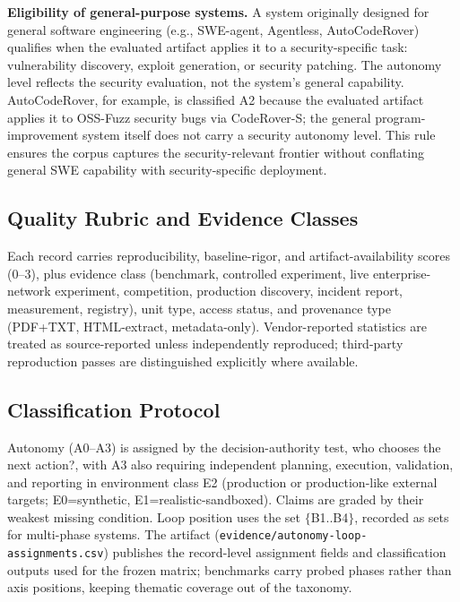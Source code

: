 \documentclass[conference,compsoc]{IEEEtran}
\begin{document}
\textbf{Eligibility of general-purpose systems.} A system originally designed for general
software engineering (e.g., SWE-agent, Agentless, AutoCodeRover) qualifies when the
evaluated artifact applies it to a security-specific task: vulnerability discovery, exploit
generation, or security patching. The autonomy level reflects the security evaluation, not
the system's general capability. AutoCodeRover, for example, is classified A2 because the
evaluated artifact applies it to OSS-Fuzz security bugs via CodeRover-S; the general
program-improvement system itself does not carry a security autonomy level. This rule ensures
the corpus captures the security-relevant frontier without conflating general SWE
capability with security-specific deployment.

\subsection{Quality Rubric and Evidence Classes}
Each record carries reproducibility, baseline-rigor, and artifact-availability scores (0--3),
plus evidence class (benchmark, controlled experiment, live enterprise-network experiment,
competition, production discovery, incident report, measurement, registry), unit type, access
status, and provenance type (PDF+TXT, HTML-extract, metadata-only). Vendor-reported statistics
are treated as source-reported unless independently reproduced; third-party reproduction passes
are distinguished explicitly where available.

\subsection{Classification Protocol}
Autonomy (A0--A3) is assigned by the decision-authority test, who chooses the next action?, 
with A3 also requiring independent planning, execution, validation, and reporting in
environment class E2 (production or production-like external targets; E0=synthetic,
E1=realistic-sandboxed). Claims are graded by their weakest missing condition. Loop position
uses the set $\{$B1..B4$\}$, recorded as sets for multi-phase systems. The artifact
(\texttt{evidence/autonomy-loop-assignments.csv}) publishes the record-level assignment fields and
classification outputs used for the frozen matrix;
benchmarks carry probed phases rather than axis positions, keeping thematic coverage out of the
taxonomy.
\end{document}

